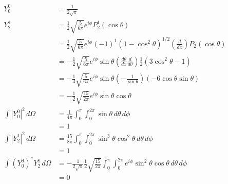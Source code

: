 \documentclass{article}
\begin{document}
\subsection{}

\begin{align*}
  Y_0^0                           & = \frac{1}{2 \sqrt{\pi}}                                                                                                                              \\
  Y_2^1                           & = \frac{1}{2} \sqrt{\frac{5}{6 \pi}} e^{i \phi} P_2^1(\cos \theta)                                                                                    \\
                                  & = \frac{1}{2} \sqrt{\frac{5}{6 \pi}} e^{i \phi} (-1)^1 (1 - \cos^2 \theta)^{1 / 2} \left( \frac{d}{d x} \right) P_2(\cos \theta)                      \\
                                  & = -\frac{1}{2} \sqrt{\frac{5}{6 \pi}} e^{i \phi} \sin \theta \left( \frac{d \theta}{d x} \frac{d}{d \theta} \right) \frac{1}{2} (3 \cos^2 \theta - 1) \\
                                  & = -\frac{1}{4} \sqrt{\frac{5}{6 \pi}} e^{i \phi} \sin \theta \left( -\frac{1}{\sin \theta} \right) (-6 \cos \theta \sin \theta)                       \\
                                  & = -\frac{1}{2} \sqrt{\frac{15}{2 \pi}} e^{i \phi} \sin \theta \cos \theta                                                                             \\
  \int |Y_0^0|^2 \,d \Omega       & = \frac{1}{4 \pi} \int_0^\pi \int_0^{2 \pi} \sin \theta \,d \theta \,d \phi                                                                           \\
                                  & = 1                                                                                                                                                   \\
  \int |Y_2^1|^2 \,d \Omega       & = \frac{15}{8 \pi} \int_0^\pi \int_0^{2 \pi} \sin^3 \theta \cos^2 \theta \,d \theta \,d \phi                                                          \\
                                  & = 1                                                                                                                                                   \\
  \int (Y_0^0)^* Y_2^1 \,d \Omega & = -\frac{1}{2 \sqrt{\pi}} \frac{1}{2} \sqrt{\frac{15}{2 \pi}} \int_0^\pi \int_0^{2 \pi} e^{i \phi} \sin^2 \theta \cos \theta \,d \theta \,d \phi      \\
                                  & = 0
\end{align*}
\end{document}
